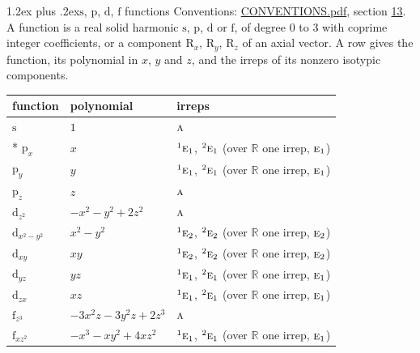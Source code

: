 \documentclass[10pt,a4paper]{article}
\makeatletter
\renewcommand\section{\@startsection{section}{1}{\z@}{-3ex plus -1ex minus -.2ex}%
  {1.2ex plus .2ex}{\normalfont\large\sffamily\bfseries\color{parttitle}}}
\numberwithin{equation}{section}
\newcommand{\irr}[1]{\text{\normalfont\scshape #1}}
\newcommand{\conjpair}[1]{{}^{#1}}
\newcommand{\orbital}[1]{\mathrm{#1}}
\makeatother
\begin{document}
\section{\texorpdfstring{$\orbital{s}$, $\orbital{p}$, $\orbital{d}$, $\orbital{f}$}{s, p, d, f} functions}\label{s:orbitals}
Conventions: \href{../../CONVENTIONS.pdf}{CONVENTIONS.pdf}, section \href{../../CONVENTIONS.pdf\#conv.13}{13}.
\leavevmode\label{n:head.function}A function is a real solid harmonic $\orbital{s}$, $\orbital{p}$, $\orbital{d}$ or $\orbital{f}$, of degree 0 to 3 with coprime integer coefficients, or a component $\orbital{R}_{x}$, $\orbital{R}_{y}$, $\orbital{R}_{z}$ of an axial vector. \label{n:head.polynomial}\label{n:head.irreps}A row gives the function, its polynomial in $x$, $y$ and $z$, and the irreps of its nonzero isotypic components.
{\small\begin{longtable}{@{}lll@{}}\toprule
function & polynomial & irreps\\\midrule\endhead
\bottomrule\endfoot\endlastfoot
$\orbital{s}$ & $1$ & $\irr{a}$\\*
$\orbital{p}_{x}$ & $x$ & $\conjpair{1}\irr{e}_{1}$, $\conjpair{2}\irr{e}_{1}$ (over $\mathbb{R}$ one irrep, $\irr{e}_{1}$)\\
$\orbital{p}_{y}$ & $y$ & $\conjpair{1}\irr{e}_{1}$, $\conjpair{2}\irr{e}_{1}$ (over $\mathbb{R}$ one irrep, $\irr{e}_{1}$)\\
$\orbital{p}_{z}$ & $z$ & $\irr{a}$\\
$\orbital{d}_{z^2}$ & $-x^{2} - y^{2} + 2z^{2}$ & $\irr{a}$\\
$\orbital{d}_{x^2-y^2}$ & $x^{2} - y^{2}$ & $\conjpair{1}\irr{e}_{2}$, $\conjpair{2}\irr{e}_{2}$ (over $\mathbb{R}$ one irrep, $\irr{e}_{2}$)\\
$\orbital{d}_{xy}$ & $xy$ & $\conjpair{1}\irr{e}_{2}$, $\conjpair{2}\irr{e}_{2}$ (over $\mathbb{R}$ one irrep, $\irr{e}_{2}$)\\
$\orbital{d}_{yz}$ & $yz$ & $\conjpair{1}\irr{e}_{1}$, $\conjpair{2}\irr{e}_{1}$ (over $\mathbb{R}$ one irrep, $\irr{e}_{1}$)\\
$\orbital{d}_{zx}$ & $xz$ & $\conjpair{1}\irr{e}_{1}$, $\conjpair{2}\irr{e}_{1}$ (over $\mathbb{R}$ one irrep, $\irr{e}_{1}$)\\
$\orbital{f}_{z^3}$ & $-3x^{2}z - 3y^{2}z + 2z^{3}$ & $\irr{a}$\\
$\orbital{f}_{xz^2}$ & $-x^{3} - xy^{2} + 4xz^{2}$ & $\conjpair{1}\irr{e}_{1}$, $\conjpair{2}\irr{e}_{1}$ (over $\mathbb{R}$ one irrep, $\irr{e}_{1}$)\\

\end{longtable}}
\end{document}
